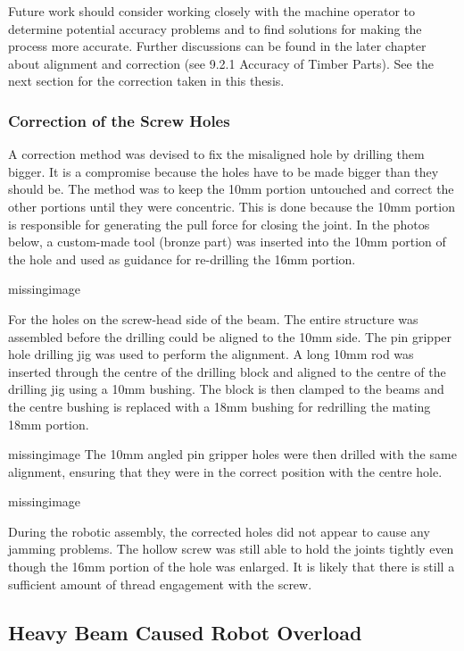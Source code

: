 Future work should consider working closely with the machine operator to determine potential accuracy problems and to find solutions for making the process more accurate. Further discussions can be found in the later chapter about alignment and correction (see 9.2.1 Accuracy of Timber Parts).
See the next section for the correction taken in this thesis.

\subsubsection{Correction of the Screw Holes}
\label{subsubsection:exploration_4_correction_of_the_screw_holes}

A correction method was devised to fix the misaligned hole by drilling them bigger. It is a compromise because the holes have to be made bigger than they should be. 
The method was to keep the 10mm portion untouched and correct the other portions until they were concentric. This is done because the 10mm portion is responsible for generating the pull force for closing the joint. In the photos below, a custom-made tool (bronze part) was inserted into the 10mm portion of the hole and used as guidance for re-drilling the 16mm portion.

missingimage

For the holes on the screw-head side of the beam. The entire structure was assembled before the drilling could be aligned to the 10mm side. The pin gripper hole drilling jig was used to perform the alignment. A long 10mm rod was inserted through the centre of the drilling block and aligned to the centre of the drilling jig using a 10mm bushing. The block is then clamped to the beams and the centre bushing is replaced with a 18mm bushing for redrilling the mating 18mm portion. 

missingimage
The 10mm angled pin gripper holes were then drilled with the same alignment, ensuring that they were in the correct position with the centre hole. 

missingimage

During the robotic assembly, the corrected holes did not appear to cause any jamming problems. The hollow screw was still able to hold the joints tightly even though the 16mm portion of the hole was enlarged. It is likely that there is still a sufficient amount of thread engagement with the screw.

\subsection{Heavy Beam Caused Robot Overload}
\label{subsection:exploration_4_heavy_beam_caused_robot_overload}

